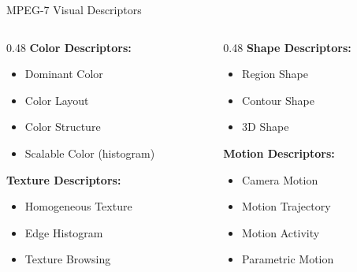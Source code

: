 \documentclass[aspectratio=169,12pt]{beamer}
\begin{document}
\begin{frame}{MPEG-7 Visual Descriptors}
    \begin{columns}
        \begin{column}{0.48\textwidth}
            \textbf{Color Descriptors:}
            \begin{itemize}
                \item Dominant Color
                \item Color Layout
                \item Color Structure
                \item Scalable Color (histogram)
            \end{itemize}
            
            \vspace{0.2cm}
            \textbf{Texture Descriptors:}
            \begin{itemize}
                \item Homogeneous Texture
                \item Edge Histogram
                \item Texture Browsing
            \end{itemize}
        \end{column}
        \begin{column}{0.48\textwidth}
            \textbf{Shape Descriptors:}
            \begin{itemize}
                \item Region Shape
                \item Contour Shape
                \item 3D Shape
            \end{itemize}
            
            \vspace{0.2cm}
            \textbf{Motion Descriptors:}
            \begin{itemize}
                \item Camera Motion
                \item Motion Trajectory
                \item Motion Activity
                \item Parametric Motion
            \end{itemize}
        \end{column}
    \end{columns}
\end{frame}
\end{document}
